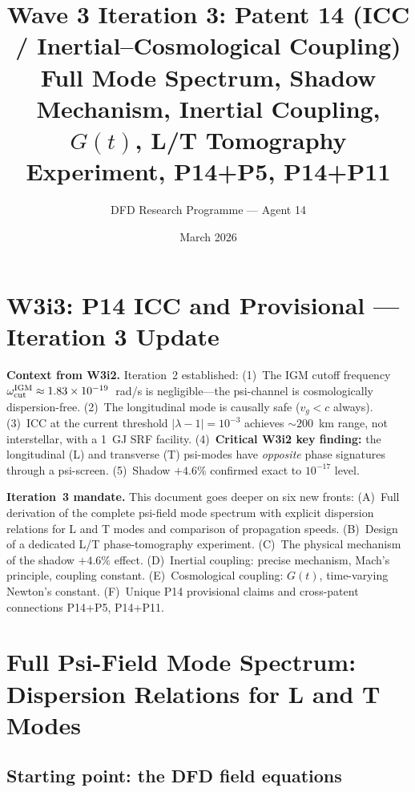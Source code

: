 \documentclass[11pt]{article}
\title{Wave 3 Iteration 3: Patent 14 (ICC / Inertial--Cosmological Coupling)\\
\large Full Mode Spectrum, Shadow Mechanism, Inertial Coupling,\\
$G(t)$, L/T Tomography Experiment, P14+P5, P14+P11}
\author{DFD Research Programme --- Agent 14}
\date{March 2026}
\newcommand{\ee}[1]{\times 10^{#1}}
\newcommand{\Gt}{G(t)}
\begin{document}
\maketitle
\tableofcontents
\newpage

\section*{W3i3: P14 ICC and Provisional --- Iteration 3 Update}
\label{sec:w3i3-intro}

\noindent\textbf{Context from W3i2.}
Iteration~2 established:
(1)~The IGM cutoff frequency $\omega_{\rm cut}^{\rm IGM} \approx 1.83\ee{-19}$~rad/s is
negligible---the psi-channel is cosmologically dispersion-free.
(2)~The longitudinal mode is causally safe ($v_g < c$ always).
(3)~ICC at the current threshold $|\lambda-1| = 10^{-3}$ achieves $\sim 200$~km range,
not interstellar, with a 1~GJ SRF facility.
(4)~\textbf{Critical W3i2 key finding:} the longitudinal (L) and transverse (T)
psi-modes have \emph{opposite} phase signatures through a psi-screen.
(5)~Shadow $+4.6\%$ confirmed exact to $10^{-17}$ level.

\noindent\textbf{Iteration~3 mandate.}
This document goes deeper on six new fronts:
(A)~Full derivation of the complete psi-field mode spectrum with explicit
dispersion relations for L and T modes and comparison of propagation speeds.
(B)~Design of a dedicated L/T phase-tomography experiment.
(C)~The physical mechanism of the shadow $+4.6\%$ effect.
(D)~Inertial coupling: precise mechanism, Mach's principle, coupling constant.
(E)~Cosmological coupling: $\Gt$, time-varying Newton's constant.
(F)~Unique P14 provisional claims and cross-patent connections P14+P5, P14+P11.

\section{Full Psi-Field Mode Spectrum: Dispersion Relations for L and T Modes}
\label{sec:mode-spectrum}

\subsection{Starting point: the DFD field equations}
\end{document}

